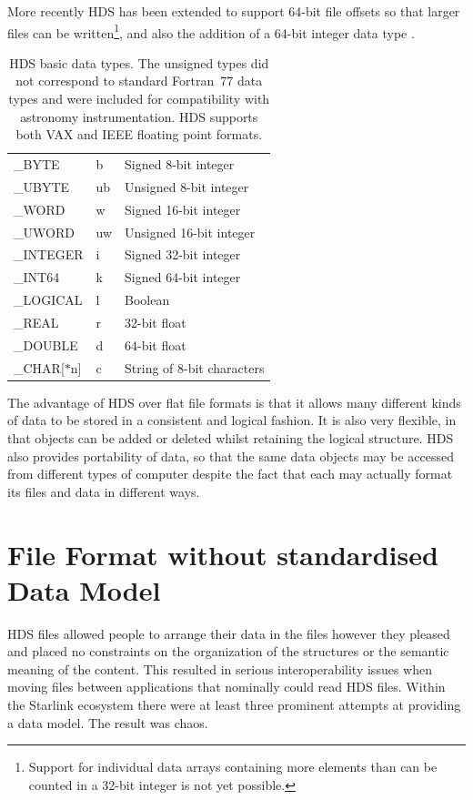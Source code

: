\documentclass[final,authoryear,5p,times,twocolumn]{elsarticle}
\begin{document}
More recently HDS has been extended to support 64-bit file offsets so
that larger files can be written\footnote{Support for individual data
arrays containing more elements than can be counted in a 32-bit
integer is not yet possible.}, and also the
addition of a 64-bit integer data type \citep{P82_adassxxiii}.

\begin{table}
\caption{HDS basic data types. The unsigned types did not correspond
  to standard Fortran~77 data types and were included for
  compatibility with astronomy instrumentation. HDS supports both VAX
  and IEEE floating point formats.}
\label{tab:hdstypes}
\begin{center}
\begin{tabular}{lll}
\hline
\_BYTE & b & Signed 8-bit integer \\
\_UBYTE & ub & Unsigned 8-bit integer \\
\_WORD & w & Signed 16-bit integer \\
\_UWORD & uw & Unsigned 16-bit integer \\
\_INTEGER & i & Signed 32-bit integer \\
\_INT64 & k &Signed 64-bit integer \\
\_LOGICAL & l & Boolean \\
\_REAL & r & 32-bit float \\
\_DOUBLE & d & 64-bit float \\
\_CHAR[$*$n] & c & String of 8-bit characters \\
\hline
\end{tabular}
\end{center}
\end{table}

The advantage of HDS over flat file formats is that it allows many different kinds of data to
be stored in a consistent and logical fashion. It is also very
flexible, in that objects can be added or deleted whilst retaining the
logical structure. HDS also provides portability of data, so that the
same data objects may be accessed from different types of computer
despite the fact that each may actually format its files and data in
different ways.

\section{File Format without standardised Data Model}
\label{sec:chaos}

HDS files allowed people to arrange their data in the files however
they pleased and placed no constraints on the organization of the
structures or the semantic meaning of the content. This resulted in
serious interoperability issues when moving files between applications
that nominally could read HDS files. Within the Starlink ecosystem
there were at least three prominent attempts at providing a data model.
The result was chaos.
\end{document}
